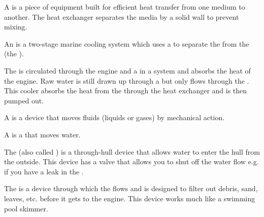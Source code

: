 \begin{module}[id=enclosed-cooling-system]

\begin{definition}[title=Heat Exchanger]
  A  is a piece of equipment built for efficient heat transfer from
  one medium to another. The heat exchanger separates the media by a solid wall to prevent
  mixing.
\end{definition}

\begin{definition}[title=Enclosed Cooling System]
  An  is a two-stage marine cooling system which uses a
   to separate the  from the 
  (the ).
  

  The  is circulated through the engine and a
   in a  system and absorbs the heat of the
  engine. Raw water is still drawn up through a  but only flows through the
  . This cooler  absorbs the heat from the  through the heat exchanger and is then pumped out.
\end{definition}
 
\begin{definition}[title=Pump]
  A  is a device that moves fluids (liquids or gases) by mechanical action.
\end{definition}

\begin{definition}[title=Water Pump]
  A  is a  that moves water.
\end{definition}

\begin{definition}[title=Seacock]
  The  (also called ) is a
  through-hull device that allows water to enter the hull from the outside. This device
  has a valve that allows you to shut off the water flow e.g. if you have a leak in the
  .
\end{definition}

\begin{definition}[title=Sea Strainer]
  The  is a device through which the  flows and is designed
  to filter out debris, sand, leaves, etc. before it gets to the engine. This device works
  much like a swimming pool skimmer.
\end{definition}
\end{module}

